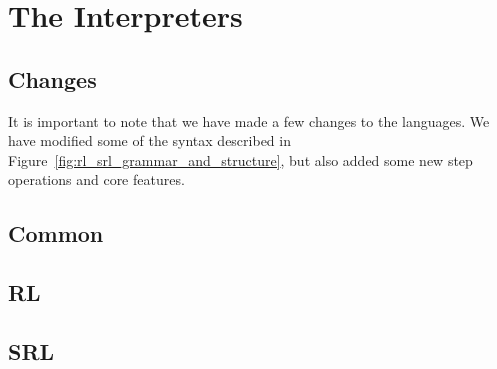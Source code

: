 
\section*{The Interpreters}
%

\subsection*{Changes}
%

%
%
%

It is important to note that we have made a few changes to the languages. We have modified some of the syntax described in Figure~\ref{fig:rl_srl_grammar_and_structure}, but also added some new step operations and core features.

\subsection*{Common}
%

\subsection*{RL}
%

\subsection*{SRL}
%

